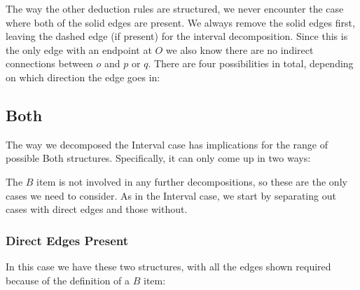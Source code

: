 The way the other deduction rules are structured, we never encounter the case where both of the solid edges are present.
We always remove the solid edges first, leaving the dashed edge (if present) for the interval decomposition.
Since this is the only edge with an endpoint at $O$ we also know there are no indirect connections between $o$ and $p$ or $q$.
There are four possibilities in total, depending on which direction the edge goes in:


\subsection{Both}
The way we decomposed the Interval case has implications for the range of possible Both structures.
Specifically, it can only come up in two ways:


The $B$ item is not involved in any further decompositions, so these are the only cases we need to consider.
As in the Interval case, we start by separating out cases with direct edges and those without.

\subsubsection{Direct Edges Present}
In this case we have these two structures, with all the edges shown required because of the definition of a $B$ item:

